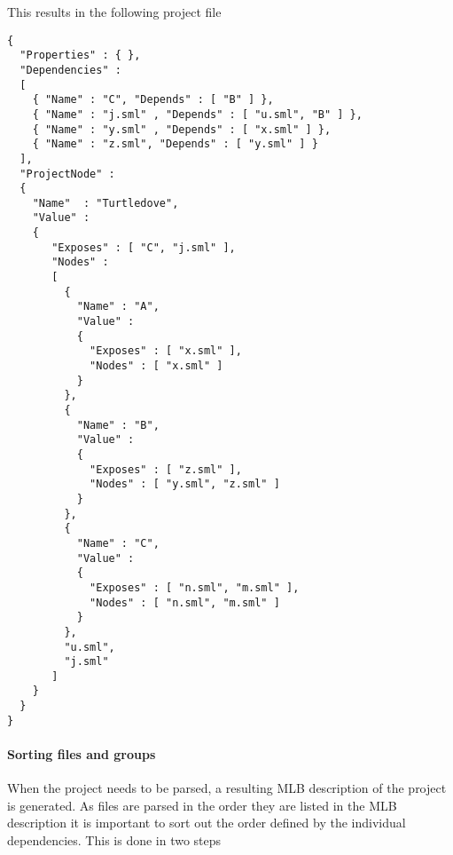 \begin{example}
  
  This results in the following project file
  
\begin{lstlisting}
{
  "Properties" : { },
  "Dependencies" : 
  [
    { "Name" : "C", "Depends" : [ "B" ] },
    { "Name" : "j.sml" , "Depends" : [ "u.sml", "B" ] },
    { "Name" : "y.sml" , "Depends" : [ "x.sml" ] },
    { "Name" : "z.sml", "Depends" : [ "y.sml" ] }
  ],
  "ProjectNode" :
  {
    "Name"  : "Turtledove",
    "Value" : 
    {
       "Exposes" : [ "C", "j.sml" ],
       "Nodes" :
       [
         {
           "Name" : "A",
           "Value" :
           {
             "Exposes" : [ "x.sml" ],
             "Nodes" : [ "x.sml" ]
           }          
         },
         {
           "Name" : "B",
           "Value" :
           {
             "Exposes" : [ "z.sml" ],
             "Nodes" : [ "y.sml", "z.sml" ]
           }          
         },
         {
           "Name" : "C",
           "Value" :
           {
             "Exposes" : [ "n.sml", "m.sml" ],
             "Nodes" : [ "n.sml", "m.sml" ]
           }          
         },
         "u.sml", 
         "j.sml"
       ]
    }
  }
}    
\end{lstlisting}
\end{example}

\paragraph{Sorting files and groups}

When the project needs to be parsed, a resulting MLB description of the project
is generated. As files are parsed in the order they are listed in the MLB
description it is important to sort out the order defined by the individual
dependencies. This is done in two steps

